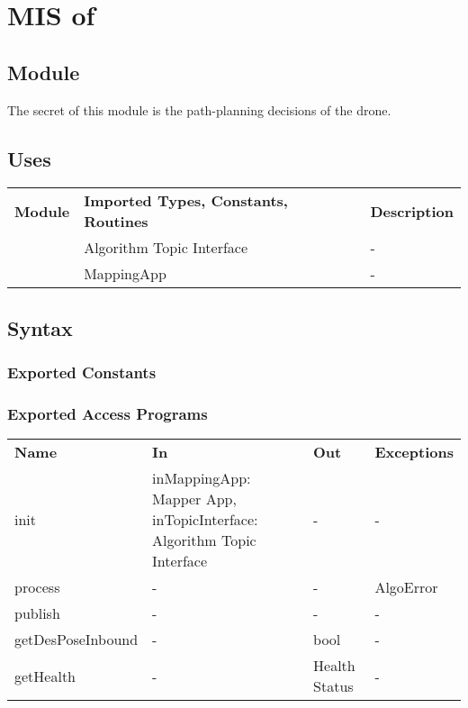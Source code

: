 \documentclass[12pt, titlepage]{article}
\begin{document}
\section{MIS of } \label{PATH_PLAN_APP} 
\subsection{Module}
The secret of this module is the path-planning decisions of the drone. 
\subsection{Uses}
\begin{center}
\begin{tabular}{p{2 cm} p{5cm} p{6.5cm} } 
\hline
\textbf{Module} & \textbf{Imported Types, Constants, Routines} & \textbf{Description} \\
\nameref{Algorithm Topic Interface} & Algorithm Topic Interface & - \\
\nameref{Mapper App} & MappingApp & - \\
\hline
\hline
\end{tabular}
\end{center}
\subsection{Syntax}
\subsubsection{Exported Constants}
\subsubsection{Exported Access Programs}
\begin{center}
\begin{tabular}{p{3.5cm} p{2.5cm} p{2.5cm} p{5cm}}
\hline
\textbf{Name} & \textbf{In} & \textbf{Out} & \textbf{Exceptions} \\
init & inMappingApp: Mapper App, inTopicInterface: Algorithm Topic Interface & - & - \\
process & - & - & AlgoError \\
publish & - & - & - \\
getDesPoseInbound & - & bool & - \\
getHealth & - & Health Status & - \\
\hline
\hline
\end{tabular}
\end{center}
\end{document}
